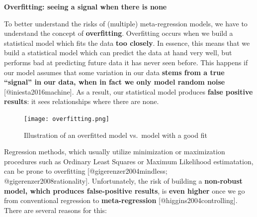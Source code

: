 \documentclass[]{book}
\begin{document}
\begin{rmdachtung}
\textbf{Overfitting: seeing a signal when there is none}

To better understand the risks of (multiple) meta-regression models, we
have to understand the concept of \textbf{overfitting}. Overfitting
occurs when we build a statistical model which fits the data \textbf{too
closely}. In essence, this means that we build a statistical model which
can predict the data at hand very well, but performs bad at predicting
future data it has never seen before. This happens if our model assumes
that some variation in our data \textbf{stems from a true ``signal'' in
our data, when in fact we only model random noise}
{[}@iniesta2016machine{]}. As a result, our statistical model produces
\textbf{false positive results}: it sees relationships where there are
none.

\begin{figure}
\centering
\texttt{[image: overfitting.png]}
\caption{Illustration of an overfitted model vs.~model with a good fit}
\end{figure}

Regression methods, which usually utilize minimization or maximization
procedures such as Ordinary Least Squares or Maximum Likelihood
estimatation, can be prone to overfitting {[}@gigerenzer2004mindless;
@gigerenzer2008rationality{]}. Unfortunately, the risk of building a
\textbf{non-robust model, which produces false-positive results}, is
\textbf{even higher} once we go from conventional regression to
\textbf{meta-regression} {[}@higgins2004controlling{]}. There are
several reasons for this:


\end{rmdachtung}
\end{document}
